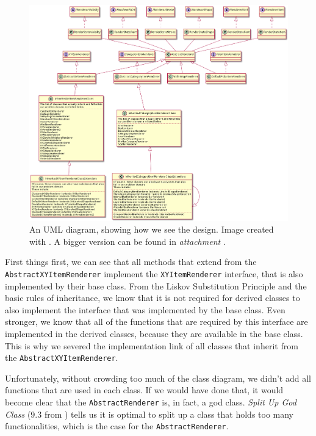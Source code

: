 \documentclass[11pt]{article}
\begin{document}
	\begin{figure}[H]
		\centering
		\includegraphics[scale=0.3]{pictures/class-diagram-ours.png}
		\caption{An UML diagram, showing how we see the design. Image created with \cite{plantuml}. A bigger version can be found in \textsl{attachment \pageref{class-diagram-ours}}.}
		\label{fig:UML-start}
	\end{figure}
	
	First things first, we can see that all methods that extend from the \texttt{AbstractXYItemRenderer} implement the \texttt{XYItemRenderer} interface, that is also implemented by their base class. From the \textsf{Liskov Substitution Principle} and the basic rules of inheritance, we know that it is not required for derived classes to also implement the interface that was implemented by the base class. Even stronger, we know that all of the functions that are required by this interface are implemented in the derived classes, because they are available in the base class. This is why we severed the implementation link of all classes that inherit from the \texttt{AbstractXYItemRenderer}.
	
	Unfortunately, without crowding too much of the class diagram, we didn't add all functions that are used in each class. If we would have done that, it would become clear that the \texttt{AbstractRenderer} is, in fact, a god class. \textsl{Split Up God Class} (9.3 from \cite{demeyer2009object}) tells us it is optimal to split up a class that holds too many functionalities, which is the case for the \texttt{AbstractRenderer}.
	
\end{document}
